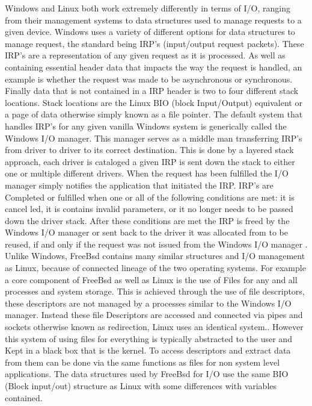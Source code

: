 \documentclass[letterpaper,10pt,titlepage]{IEEEtran}
\begin{document}
Windows and Linux both work extremely differently in terms of I/O, ranging from their management systems to data structures used to manage requests to a given device. Windows uses a variety of different options for data structures to manage request, the standard being IRP's (input/output request packets)\cite{Understa77:online}. These IRP's are a representation of any given request as it is processed. As well as containing essential header data that impacts the way the request is handled, an example is whether the request was made to be asynchronous or synchronous. Finally data that is not contained in a IRP header is two to four different stack locations\cite{Understa77:online}. Stack locations are the Linux BIO (block Input/Output) equivalent or a page of data otherwise simply known as a file pointer. The default system that handles IRP's for any given vanilla Windows system is generically called the Windows I/O manager. This manager serves as a  middle man transferring IRP's from driver to driver to its correct destination. This is done by a layered stack approach, each driver is cataloged a given IRP is sent down the stack to either one or multiple different drivers. When the request has been fulfilled the I/O manager simply notifies the application that initiated the IRP. IRP's are Completed or fulfilled when one or all of the following conditions are met: it is cancel led, it is contains invalid parameters, or it no longer needs to be passed down the driver stack\cite{WhentoCo44:online}. After these conditions are met the IRP is freed by the Windows I/O manager or sent back to the driver it was allocated from to be reused, if and only if the request was not issued from the Windows I/O manager \cite{ReusingI59:online}.\\

Unlike Windows, FreeBsd contains many similar structures and I/O management as Linux, because of connected lineage of the two operating systems. For example a core component of FreeBsd as well as Linux is the use of Files for any and all processes and system storage. This is achieved through the use of file descriptors, these descriptors are not managed by a processes similar to the Windows I/O manager. Instead these file Descriptors are accessed and connected via pipes and sockets otherwise known as redirection, Linux uses an identical system.\cite{freeBsdBook}. However this system of using files for everything is typically abstracted to the user and Kept in a black box that is the kernel. To access descriptors and extract data from them can be done via the same functions as files for non system level applications. The data structures used by FreeBsd for I/O use the same BIO (Block input/out) structure as Linux with some differences with variables contained\cite{kong_2012}.\\
\end{document}
